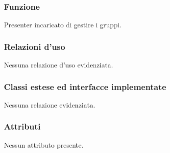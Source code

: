 
\subsubsection*{Funzione}
Presenter incaricato di gestire i gruppi.

\subsubsection*{Relazioni d'uso}
Nessuna relazione d'uso evidenziata.

\subsubsection*{Classi estese ed interfacce implementate}
Nessuna relazione evidenziata.

\subsubsection*{Attributi}
\begin{description}
\item Nessun attributo presente.
\end{description}

